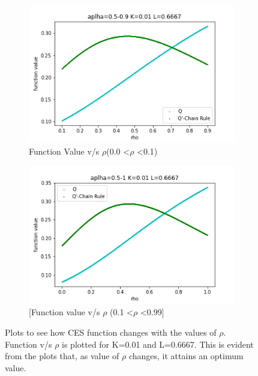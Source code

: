 \documentclass{article}
\begin{document}
\begin{figure}[htpb]
\centering
\begin{subfigure}{0.45\textwidth}
\centering
\includegraphics[width=\linewidth]{images/graphs/Q1_chain_0.101_0.9_alpha_0.5.png}
\caption{Function Value v/s $\rho$(0.0 \textless $\rho$ \textless 0.1)}
\end{subfigure}
\begin{subfigure}{0.45\textwidth}
\includegraphics[width=\linewidth]{images/graphs/Q1_chain_alpha_0.5.png}
\caption{[Function value v/s $\rho$ (0.1 \textless $\rho$ \textless 0.99]}
\end{subfigure}
\caption{Plots to see how CES function changes with the values of $\rho$. Function v/s $\rho$ is plotted for K=0.01 and L=0.6667. This is evident from the plots that, as value of $\rho$ changes, it attains an optimum value. }
\label{fig:test3}
\end{figure}
\end{document}
